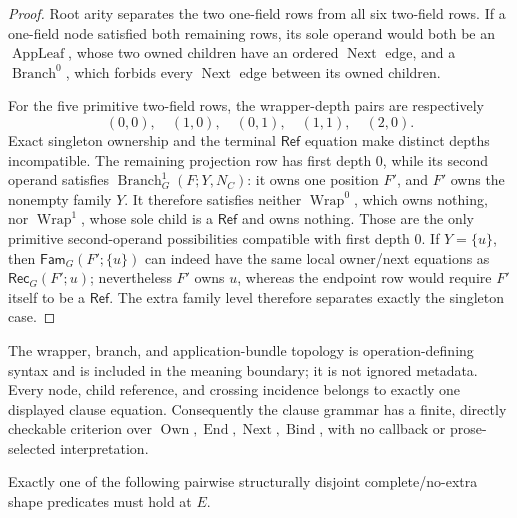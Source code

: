 \documentclass[11pt,twoside]{article}
\newcommand{\Rec}{\mathsf{Rec}}
\newcommand{\Fam}{\mathsf{Fam}}
\newcommand{\RefPos}{\mathsf{Ref}}
\begin{document}
\begin{proof}
Root arity separates the two one-field rows from all six two-field rows.  If a
one-field node satisfied both remaining rows, its sole operand would both be an
\(\operatorname{AppLeaf}\), whose two owned children have an ordered
\(\operatorname{Next}\) edge, and a \(\operatorname{Branch}^0\), which forbids
every \(\operatorname{Next}\) edge between its owned children.

For the five primitive two-field rows, the wrapper-depth pairs are respectively
\[
 (0,0),\quad(1,0),\quad(0,1),\quad(1,1),\quad(2,0).
\]
Exact singleton ownership and the terminal \(\RefPos\) equation make distinct
depths incompatible.  The remaining
projection row has first depth \(0\), while its second operand satisfies
\(\operatorname{Branch}^1_G(F;Y,N_C)\): it owns one position \(F'\), and \(F'\)
owns the nonempty family \(Y\).  It therefore satisfies neither
\(\operatorname{Wrap}^0\), which owns nothing, nor
\(\operatorname{Wrap}^1\), whose sole child is a \(\RefPos\) and owns nothing.
Those are the only primitive second-operand possibilities compatible with first
depth \(0\).  If \(Y=\{u\}\), then
\(\Fam_G(F';\{u\})\) can indeed have the same local owner/next equations as
\(\Rec_G(F';u)\); nevertheless \(F'\) owns \(u\), whereas the endpoint row would
require \(F'\) itself to be a \(\RefPos\).  The extra family level therefore
separates exactly the singleton case.
\end{proof}

The wrapper, branch, and application-bundle topology is operation-defining syntax
and is included in the meaning boundary; it is not ignored metadata.  Every node,
child reference, and crossing incidence belongs to exactly one displayed clause
equation.  Consequently the clause grammar has a finite, directly checkable
criterion over
\(\operatorname{Own},\operatorname{End},\operatorname{Next},
\operatorname{Bind}\), with no callback or prose-selected interpretation.

Exactly one of the following pairwise structurally disjoint complete/no-extra
shape predicates must hold at \(E\).
\end{document}
